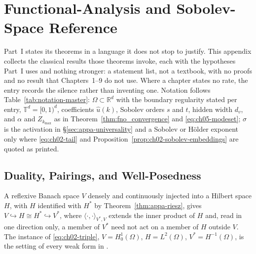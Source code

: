 
\chapter{Functional-Analysis and Sobolev-Space Reference}\label{app:a}

Part~I states its theorems in a language it does not stop to justify. This appendix collects
the classical results those theorems invoke, each with the hypotheses Part~I uses and nothing
stronger: a statement list, not a textbook, with no proofs and no result that Chapters~1--9
do not use. Where a chapter states no rate, the entry records the silence rather than
inventing one. Notation follows Table~\ref{tab:notation-master}: $\Omega \subset \mathbb{R}^d$
with the boundary regularity stated per entry, $\mathbb{T}^d = [0,1)^d$, coefficients
$\hat{u}(k)$, Sobolev orders $s$ and $t$, hidden width $d_v$, and $\alpha$ and $Z_{k_{\max}}$
as in Theorem~\ref{thm:fno_convergence} and \eqref{eq:ch05-modeset}; $\sigma$ is the activation
in \S\ref{sec:appa-universality} and a Sobolev or H\"older exponent only where
\eqref{eq:ch02-tail} and Proposition~\ref{prop:ch02-sobolev-embeddings} are quoted as printed.

\section{Duality, Pairings, and Well-Posedness}

\begin{definition}\label{def:appa-triple}
A reflexive Banach space $V$ densely and continuously injected into a Hilbert space $H$, with
$H$ identified with $H^*$ by Theorem~\ref{thm:appa-riesz}, gives
$V \hookrightarrow H \cong H^* \hookrightarrow V^*$, where $\langle \cdot, \cdot
\rangle_{V^*, V}$ extends the inner product of $H$ and, read in one direction only, a member
of $V^*$ need not act on a member of $H$ outside $V$. The instance of \eqref{eq:ch02-triple},
$V = H^1_0(\Omega)$, $H = L^2(\Omega)$, $V^* = H^{-1}(\Omega)$, is the setting of every weak
form in .
\end{definition}

